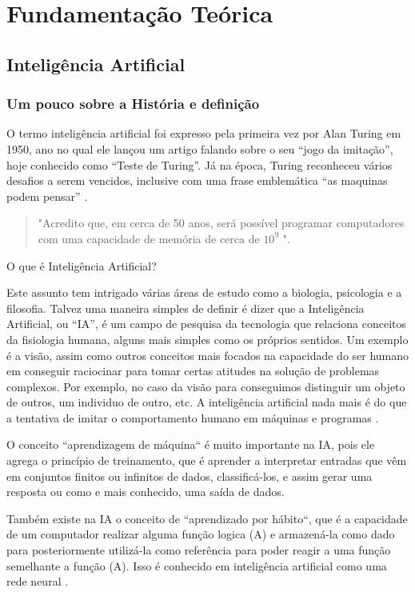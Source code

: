 \chapter{Fundamentação Teórica}\label{cap:fundTeo}

\section{Inteligência Artificial}

\subsection{Um pouco sobre a História e definição}
O termo inteligência artificial foi expresso pela primeira vez por Alan Turing em 1950, ano no qual ele lançou um artigo falando sobre o seu “jogo da imitação”, hoje conhecido como “Teste de Turing”. Já na época, Turing reconheceu vários desafios a serem vencidos, inclusive com uma frase emblemática “as maquinas podem pensar” \cite{alanT}.
\begin{quotation}
	\footnotesize "Acredito que, em cerca de 50 anos, será possível programar computadores com uma capacidade de memória de cerca de \(10^9\) \cite{alanT}".
\end{quotation}
O que é Inteligência Artificial? 

Este assunto tem intrigado várias áreas de estudo como a biologia, psicologia e a filosofia. Talvez uma maneira simples de definir é dizer que a  Inteligência Artificial, ou “IA”, é um campo de pesquisa da tecnologia que relaciona conceitos da fisiologia humana, alguns mais simples como os próprios sentidos. Um exemplo é a visão, assim como outros conceitos mais focados na capacidade do ser humano em conseguir raciocinar para tomar certas atitudes na solução de problemas complexos. Por exemplo, no caso da visão para conseguimos distinguir um objeto de outros, um individuo de outro, etc. A inteligência artificial nada mais é do que a tentativa de imitar o comportamento humano em máquinas e programas \cite{vinte}.


O conceito “aprendizagem de máquina“  é muito importante na IA, pois ele agrega o princípio de treinamento, que é aprender a interpretar entradas que vêm em conjuntos finitos ou infinitos de dados, classificá-los, e assim gerar uma resposta ou como e mais conhecido, uma saída de dados. 

Também existe na IA o conceito de “aprendizado por hábito“, que é a capacidade de um computador realizar alguma função logica (A) e armazená-la como dado para posteriormente utilizá-la como referência para poder reagir a uma função semelhante a função (A). Isso é conhecido em inteligência artificial como uma rede neural \cite{vinte}.


